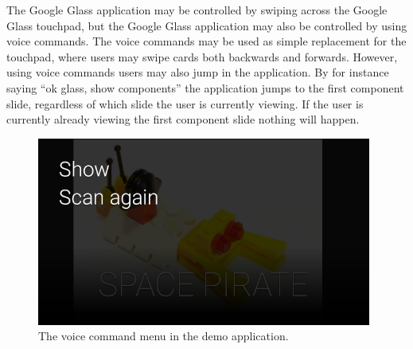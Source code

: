 The Google Glass application may be controlled by swiping across the Google Glass touchpad, but the Google Glass application may also be controlled by using voice commands. The voice commands may be used as simple replacement for the touchpad, where users may swipe cards both backwards and forwards. However, using voice commands users may also jump in the application. By for instance saying ``ok glass, show components'' the application jumps to the first component slide, regardless of which slide the user is currently viewing. If the user is currently already viewing the first component slide nothing will happen.
	
	\begin{figure}[ht!]
		\centering
		\includegraphics[width=110mm]{images/demo/voiceCommand1}
		\caption{The voice command menu in the demo application.}
		\label{glassDemoVoiceCommand}
	\end{figure}


